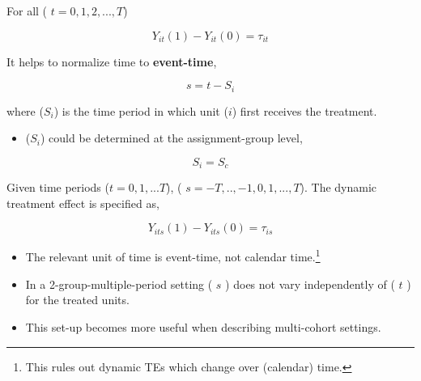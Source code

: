 \documentclass[
  letterpaper,
  DIV=11,
  numbers=noendperiod]{scrreprt}
\providecommand{\tightlist}{%
  \setlength{\itemsep}{0pt}\setlength{\parskip}{0pt}}\usepackage{longtable,booktabs,array}
\theoremstyle{definition}
\theoremstyle{remark}
\begin{document}
\begin{tcolorbox}[enhanced jigsaw, breakable, colframe=quarto-callout-note-color-frame, toptitle=1mm, toprule=.15mm, opacitybacktitle=0.6, opacityback=0, rightrule=.15mm, titlerule=0mm, colback=white, bottomtitle=1mm, title={Note}, arc=.35mm, coltitle=black, colbacktitle=quarto-callout-note-color!10!white, leftrule=.75mm, bottomrule=.15mm, left=2mm]

For all ( \(t=0,1,2,...,T\))

\[
Y_{it}(1)-Y_{it}(0) = \tau_{it}
\]

\end{tcolorbox}

It helps to normalize time to \textbf{event-time},

\[
s=t-S_{i}
\]

where (\(S_i\)) is the time period in which unit (\(i\)) first receives
the treatment.

\begin{itemize}
\tightlist
\item
  (\(S_i\)) could be determined at the assignment-group level,
\end{itemize}

\[
S_i=S_c
\]

Given time periods (\(t=0,1,...T\)), ( \(s=-T,..,-1,0,1,...,T\)). The
dynamic treatment effect is specified as,

\begin{tcolorbox}[enhanced jigsaw, breakable, colframe=quarto-callout-note-color-frame, toptitle=1mm, toprule=.15mm, opacitybacktitle=0.6, opacityback=0, rightrule=.15mm, titlerule=0mm, colback=white, bottomtitle=1mm, title={Note}, arc=.35mm, coltitle=black, colbacktitle=quarto-callout-note-color!10!white, leftrule=.75mm, bottomrule=.15mm, left=2mm]

\[
Y_{its}(1)-Y_{its}(0) = \tau_{is}
\]

\end{tcolorbox}

\begin{itemize}
\tightlist
\item
  The relevant unit of time is event-time, not calendar time.\footnote{This
    rules out dynamic TEs which change over (calendar) time.}
\item
  In a 2-group-multiple-period setting ( \(s\) ) does not vary
  independently of ( \(t\) ) for the treated units.
\item
  This set-up becomes more useful when describing multi-cohort settings.
\end{itemize}
\end{document}
